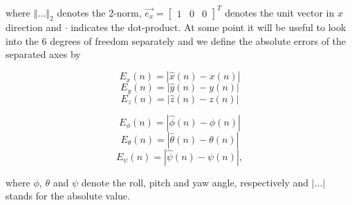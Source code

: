 where $\left\Vert \dots \right\Vert_2$ denotes the 2-norm, $\vec{e_{x}} = \left[ \begin{array}{ccc} 1& 0& 0 \end{array} \right]^T$ denotes the unit vector in $x$ direction and $\cdot$ indicates the dot-product. At some point it will be useful to look into the 6 degrees of freedom separately and we define the absolute errors of the separated axes by

\begin{equation}
       E_{x} \left( n \right) = \left| \hat{x} \left( n \right) - x \left( n \right) \right| 
\end{equation}
\begin{equation}
       E_{y} \left( n \right) = \left| \hat{y} \left( n \right) - y \left( n \right) \right|
\end{equation}
\begin{equation}
       E_{z} \left( n \right) = \left| \hat{z} \left( n \right) - z \left( n \right) \right|
\end{equation}

\begin{equation}
	E_{\phi} \left( n \right) = \left| \hat{\phi} \left( n \right) - \phi \left( n \right)\right|
\end{equation}
\begin{equation}
	E_{\theta} \left( n \right) = \left| \hat{\theta} \left( n \right) - \theta \left( n \right)\right|
\end{equation}
\begin{equation}
	E_{\psi} \left( n \right) = \left| \hat{\psi} \left( n \right) - \psi \left( n \right)\right| ,
\end{equation}

where $\phi$, $\theta$ and $\psi$ denote the roll, pitch and yaw angle, respectively and $\left| \dots \right|$ stands for the absolute value.



